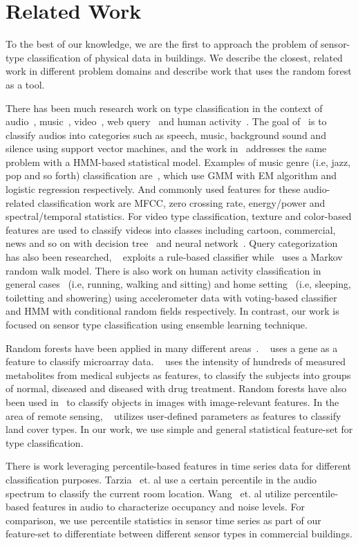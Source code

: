 \section{Related Work}
To the best of our knowledge, we are the first to approach the problem of sensor-type classification of physical data in buildings.
  We describe the closest, related work in different problem domains and describe work that uses the random forest as a tool.

There has been much research work on type classification in the context of audio~\cite{audio1,audio2}, music~\cite{music1,music2}, video~\cite{video1,video2}, 
web query~\cite{query1,query2} and human activity~\cite{activity1, activity2}. The goal of~\cite{audio1} is to classify audios into categories such as speech, 
music, background sound and silence using support vector machines, and the work in~\cite{audio2} addresses the same problem with a HMM-based statistical model. 
Examples of music genre (i.e, jazz, pop and so forth) classification are~\cite{music1,music2}, which use GMM with EM algorithm and logistic regression
respectively. And commonly used features for these audio-related classification work are MFCC, zero crossing rate, energy/power and spectral/temporal statistics. 
For video type classification, texture and color-based features are used to classify videos into classes including cartoon, commercial, news and so on 
with decision tree~\cite{video1} and neural network~\cite{video2}. Query categorization has also been researched, ~\cite{query1} exploits a rule-based classifier
while~\cite{query2} uses a Markov random walk model. There is also work on human activity classification in general cases~\cite{activity1} (i.e, running, walking 
and sitting) and home setting~\cite{activity2} (i.e, sleeping, toiletting and showering) using accelerometer data with voting-based classifier and HMM with 
conditional random fields respectively. In contrast, our work is focused on sensor type classification using ensemble learning technique.

Random forests have been applied in many different areas~\cite{RF1,RF2,RF3,RF4}. ~\cite{RF1} uses a gene as a feature 
to classify microarray data. ~\cite{RF2} uses the intensity of hundreds of measured metabolites from medical subjects as features, to classify the 
subjects into groups of normal, diseased and diseased with drug treatment. Random forests have also been used in~\cite{RF3} to classify 
 objects in images with image-relevant features. In the area of remote sensing, ~\cite{RF4} utilizes user-defined parameters as features 
 to classify land cover 
types. In our work, we use simple and general statistical feature-set for type classification.

There is work leveraging percentile-based features in time series data for different classification purposes. 
Tarzia~\cite{ABS} 
et. al use a certain percentile in the audio spectrum to classify the current room location. Wang~\cite{business} et. al utilize percentile-based features in audio to characterize occupancy and noise levels. For comparison, we use percentile statistics in sensor time series as 
part of our feature-set to differentiate between different sensor types in commercial buildings.
